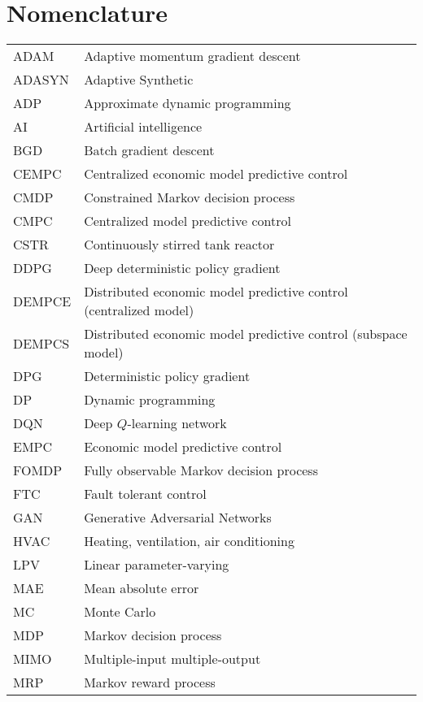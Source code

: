\documentclass[12pt]{report}
\begin{document}
\chapter*{Nomenclature}
\noindent 
\begin{tabular}{@{}ll}
ADAM & Adaptive momentum gradient descent \\
ADASYN & Adaptive Synthetic \\
ADP & Approximate dynamic programming \\
AI & Artificial intelligence \\
BGD & Batch gradient descent \\
CEMPC & Centralized economic model predictive control \\
CMDP & Constrained Markov decision process \\
CMPC & Centralized model predictive control \\
CSTR & Continuously stirred tank reactor \\
DDPG & Deep deterministic policy gradient \\
DEMPCE & Distributed economic model predictive control (centralized model) \\
DEMPCS & Distributed economic model predictive control (subspace model) \\
DPG & Deterministic policy gradient \\
DP & Dynamic programming \\
DQN & Deep $Q$-learning network \\
EMPC & Economic model predictive control \\
FOMDP & Fully observable Markov decision process \\
FTC & Fault tolerant control \\
GAN & Generative Adversarial Networks \\
HVAC & Heating, ventilation, air conditioning \\
LPV & Linear parameter-varying \\
MAE & Mean absolute error \\
MC & Monte Carlo \\
MDP & Markov decision process \\
MIMO & Multiple-input multiple-output \\
MRP & Markov reward process
\end{tabular}
\end{document}
